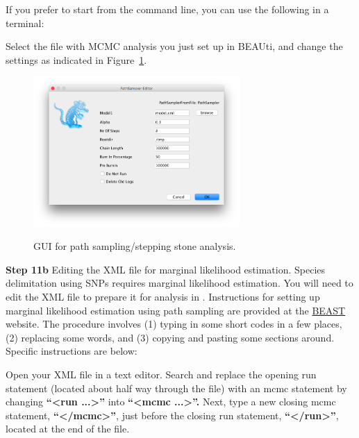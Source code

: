 {If you prefer to start from the command line, you can use the following in a terminal:


Select the file with MCMC analysis you just set up in BEAUti, and change the settings as indicated in Figure~\ref{fig:pathsampler}.

    \begin{figure}[htbp]
        \centering
        {\includegraphics[width=0.7\textwidth]{../../BFD*/screenshots/pathsampler}}
        \caption{GUI for path sampling/stepping stone analysis.}
        \label{fig:pathsampler}
    \end{figure}



{\bf Step 11b}{ Editing the XML file for marginal likelihood estimation.}
Species delimitation using SNPs requires marginal likelihood estimation. 
You will need to edit the XML file to prepare it for analysis in . Instructions for setting up
marginal likelihood estimation using path sampling are provided at the \href{http://www.beast2.org/tutorials}{BEAST} website. The procedure involves (1) typing in some short codes in a few places, (2) replacing some words, and (3) copying and pasting some sections around. Specific instructions are below:
 
Open your XML file in a text editor. Search and replace the opening run statement (located about half way through the file) with an mcmc statement by changing {\bf ``<run ...>''} into {\bf ``<mcmc ...>''.} Next, type a new closing mcmc statement, {\bf ``</mcmc>''}, just before the closing run statement, {\bf ``</run>''}, located at the end of the file.

}
